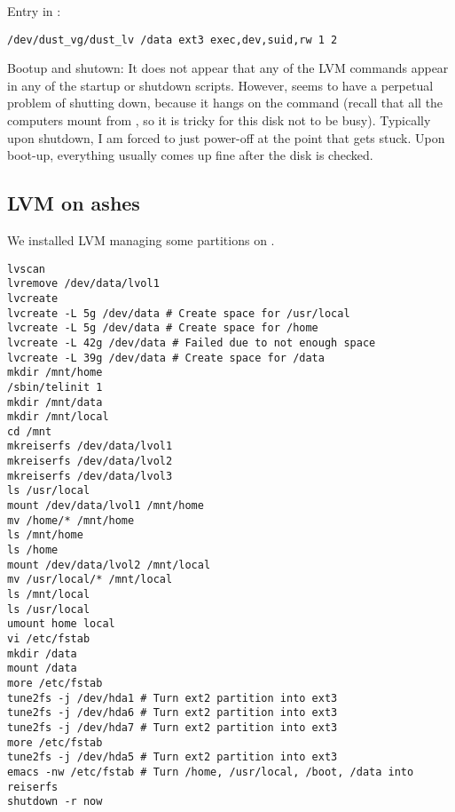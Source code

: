 \documentclass[12pt,twoside]{article}
\begin{document}
Entry in :
\begin{verbatim}
/dev/dust_vg/dust_lv /data ext3 exec,dev,suid,rw 1 2
\end{verbatim}

Bootup and shutown: It does not appear that any of the LVM commands 
appear in any of the startup or shutdown scripts.
However,  seems to have a perpetual problem of shutting
down, because it hangs on the  command (recall that all
the computers mount  from , so it is tricky
for this disk not to be busy).
Typically upon shutdown, I am forced to just power-off at the point
that  gets stuck.
Upon boot-up, everything usually comes up fine after the disk is
checked. 

\subsection{LVM on ashes}\label{sxn:lvm_ashes}
We installed LVM managing some partitions on
. 
\begin{verbatim}
lvscan
lvremove /dev/data/lvol1
lvcreate 
lvcreate -L 5g /dev/data # Create space for /usr/local
lvcreate -L 5g /dev/data # Create space for /home
lvcreate -L 42g /dev/data # Failed due to not enough space
lvcreate -L 39g /dev/data # Create space for /data
mkdir /mnt/home
/sbin/telinit 1
mkdir /mnt/data
mkdir /mnt/local
cd /mnt
mkreiserfs /dev/data/lvol1
mkreiserfs /dev/data/lvol2
mkreiserfs /dev/data/lvol3
ls /usr/local
mount /dev/data/lvol1 /mnt/home
mv /home/* /mnt/home
ls /mnt/home
ls /home
mount /dev/data/lvol2 /mnt/local
mv /usr/local/* /mnt/local
ls /mnt/local
ls /usr/local
umount home local
vi /etc/fstab
mkdir /data
mount /data
more /etc/fstab
tune2fs -j /dev/hda1 # Turn ext2 partition into ext3
tune2fs -j /dev/hda6 # Turn ext2 partition into ext3
tune2fs -j /dev/hda7 # Turn ext2 partition into ext3
more /etc/fstab
tune2fs -j /dev/hda5 # Turn ext2 partition into ext3
emacs -nw /etc/fstab # Turn /home, /usr/local, /boot, /data into reiserfs
shutdown -r now
\end{verbatim}
\end{document}

